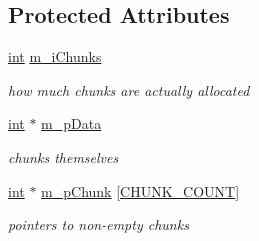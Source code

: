 \subsection*{Protected Attributes}
\begin{DoxyCompactItemize}
\item 
\hyperlink{sphinxexpr_8cpp_a4a26e8f9cb8b736e0c4cbf4d16de985e}{int} \hyperlink{classCSphLowercaser_a7d538ec8b5bb2220faa56d9b6a1032a0}{m\-\_\-i\-Chunks}
\begin{DoxyCompactList}\small\item\em how much chunks are actually allocated \end{DoxyCompactList}\item 
\hyperlink{sphinxexpr_8cpp_a4a26e8f9cb8b736e0c4cbf4d16de985e}{int} $\ast$ \hyperlink{classCSphLowercaser_a0534fc1680554432be7358d8fe374dc2}{m\-\_\-p\-Data}
\begin{DoxyCompactList}\small\item\em chunks themselves \end{DoxyCompactList}\item 
\hyperlink{sphinxexpr_8cpp_a4a26e8f9cb8b736e0c4cbf4d16de985e}{int} $\ast$ \hyperlink{classCSphLowercaser_adead3a3167621d8d6f10b5d2bd14ea9e}{m\-\_\-p\-Chunk} \mbox{[}\hyperlink{classCSphLowercaser_add46c69c33b10aa129e666946b329cb7}{C\-H\-U\-N\-K\-\_\-\-C\-O\-U\-N\-T}\mbox{]}
\begin{DoxyCompactList}\small\item\em pointers to non-\/empty chunks \end{DoxyCompactList}\end{DoxyCompactItemize}
